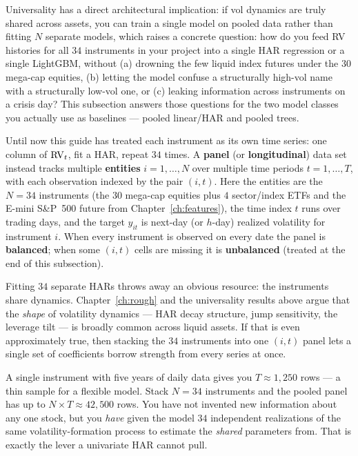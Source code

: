 Universality has a direct architectural implication: if vol dynamics are truly shared
across assets, you can train a single model on pooled data rather than fitting $N$
separate models, which raises a concrete question:
how do you feed RV histories for all $34$ instruments in your project into a single
HAR regression or a single LightGBM, without (a) drowning the few liquid index
futures under the $30$ mega-cap equities, (b) letting the model confuse a
structurally high-vol name with a structurally low-vol one, or (c) leaking
information across instruments on a crisis day?  This subsection answers those
questions for the two model classes you actually use as baselines --- pooled
linear/HAR and pooled trees.

\begin{prereq}
Until now this guide has treated each instrument as its own time series: one
column of $\operatorname{RV}_t$, fit a HAR, repeat $34$ times.  A \textbf{panel} (or
\textbf{longitudinal}) data set instead tracks multiple \textbf{entities}
$i = 1, \ldots, N$ over multiple time periods $t = 1, \ldots, T$, with each
observation indexed by the pair $(i,t)$.  Here the entities are the $N = 34$
instruments (the $30$ mega-cap equities plus $4$ sector/index ETFs and the
E-mini S\&P~500 future from Chapter~\ref{ch:features}), the time index $t$ runs
over trading days, and the
target $y_{it}$ is next-day (or $h$-day) realized volatility for instrument $i$.
When every instrument is observed on every date the panel is \textbf{balanced};
when some $(i,t)$ cells are missing it is \textbf{unbalanced} (treated at the end
of this subsection).
\end{prereq}

Fitting $34$ separate HARs throws away an obvious resource: the instruments share
dynamics.  Chapter~\ref{ch:rough} and the universality results above
\citep{SirignanoCont2019,RosenbaumZhang2022} argue that the \emph{shape} of
volatility dynamics --- HAR decay structure, jump sensitivity, the leverage tilt
--- is broadly common across liquid assets.  If that is even approximately true,
then stacking the $34$ instruments into one $(i,t)$ panel lets a single set of
coefficients borrow strength from every series at once.

\begin{intuition}
A single instrument with five years of daily data gives you $T \approx 1{,}250$
rows --- a thin sample for a flexible model.  Stack $N = 34$ instruments and the
pooled panel has up to $N \times T \approx 42{,}500$ rows.  You have not invented
new information about any one stock, but you \emph{have} given the model $34$
independent realizations of the same volatility-formation process to estimate the
\emph{shared} parameters from.  That is exactly the lever a univariate HAR cannot
pull.
\end{intuition}

